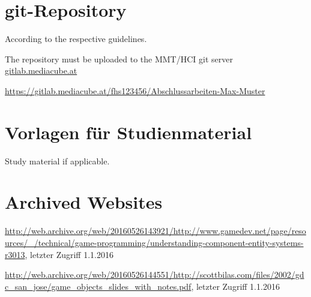 \begin{appendices}

\section{git-Repository}

According to the respective guidelines.

The repository must be uploaded to the MMT/HCI git server {\url{gitlab.mediacube.at}}

{\color{red}\url{https://gitlab.mediacube.at/fhs123456/Abschlussarbeiten-Max-Muster}}
	
\section{Vorlagen für Studienmaterial}

Study material if applicable. 

\section{Archived Websites}
\sloppy
\url{http://web.archive.org/web/20160526143921/http://www.gamedev.net/page/resources/_/technical/game-programming/understanding-component-entity-systems-r3013}, letzter Zugriff 1.1.2016

\url{http://web.archive.org/web/20160526144551/http://scottbilas.com/files/2002/gdc_san_jose/game_objects_slides_with_notes.pdf}, letzter Zugriff 1.1.2016

\end{appendices}
